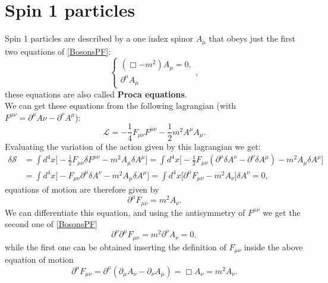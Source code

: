\section{Spin 1 particles}
Spin 1 particles are described by a one index spinor $A_{\mu}$ that obeys just the first two equations of \eqref{BosonsPF}:
\begin{equation*}
    \begin{cases}
        (\Box-m^2)A_\mu=0,\\
        \partial^\mu A_\mu
    \end{cases},
\end{equation*}
these equations are also called \textbf{Proca equations}.\\ We can get these equations from the following lagrangian (with $F^{\mu\nu}=\partial^\mu A\nu-\partial^\nu A^\mu$):
\begin{equation}\label{Spin1Lag}
    \mathcal{L} =-\frac{1}{4}F_{\mu\nu}F^{\mu\nu}-\frac{1}{2}m^2A^\mu A_\mu.
\end{equation}
Evaluating the variation of the action given by this lagrangian we get:
\begin{align*}
    \delta\mathcal{S}&=\int d^4x\bigg[-\frac{1}{2}F_{\mu\nu}\delta F^{\mu\nu}-m^2 A_\mu \delta A^\mu\bigg]=\int d^4x\bigg[-\frac{1}{2}F_{\mu\nu}(\partial^\mu\delta A^\nu-\partial^\nu\delta A^\mu)-m^2A_\mu \delta A^\mu\bigg]\\&=\int d^4x\bigg[-F_{\mu\nu}\partial^\mu\delta A^\nu-m^2 A_\mu \delta A^\mu\bigg]=\int d^4x\bigg[\partial^\mu F_{\mu\nu}-m^2 A_\nu\bigg]\delta A^\nu=0,
\end{align*}
equations of motion are therefore given by
\begin{equation*}
    \partial^\mu F_{\mu\nu}=m^2 A_\nu.
\end{equation*}
We can differentiate this equation, and using the antisymmetry of $F^{\mu\nu}$ we get the second one of \eqref{BosonsPF}
\begin{equation*}
    \partial^\nu\partial^\mu F_{\mu\nu}=m^2\partial^\nu A_\nu=0,
\end{equation*}
while the first one can be obtained inserting the definition of $F_{\mu\nu}$ inside the above equation of motion
\begin{equation*}
    \partial^\mu F_{\mu\nu}=\partial^\mu(\partial_\mu A_\nu-\partial_\nu A_\mu)=\Box A_\nu=m^2 A_\nu.
\end{equation*}

